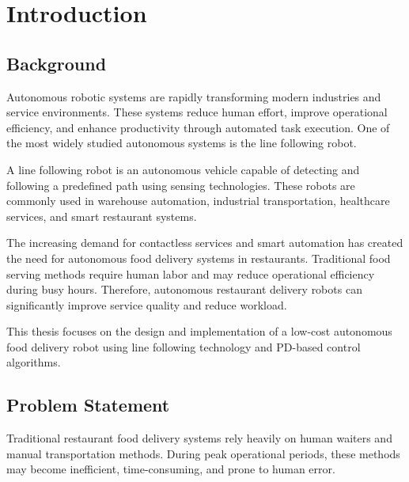 \documentclass[12pt,a4paper,oneside]{report}
\begin{document}
\newpage


\chapter{Introduction}

\section{Background}

Autonomous robotic systems are rapidly transforming modern industries and service environments. These systems reduce human effort, improve operational efficiency, and enhance productivity through automated task execution. One of the most widely studied autonomous systems is the line following robot.

A line following robot is an autonomous vehicle capable of detecting and following a predefined path using sensing technologies. These robots are commonly used in warehouse automation, industrial transportation, healthcare services, and smart restaurant systems.

The increasing demand for contactless services and smart automation has created the need for autonomous food delivery systems in restaurants. Traditional food serving methods require human labor and may reduce operational efficiency during busy hours. Therefore, autonomous restaurant delivery robots can significantly improve service quality and reduce workload.

This thesis focuses on the design and implementation of a low-cost autonomous food delivery robot using line following technology and PD-based control algorithms.


\section{Problem Statement}

Traditional restaurant food delivery systems rely heavily on human waiters and manual transportation methods. During peak operational periods, these methods may become inefficient, time-consuming, and prone to human error.
\end{document}
